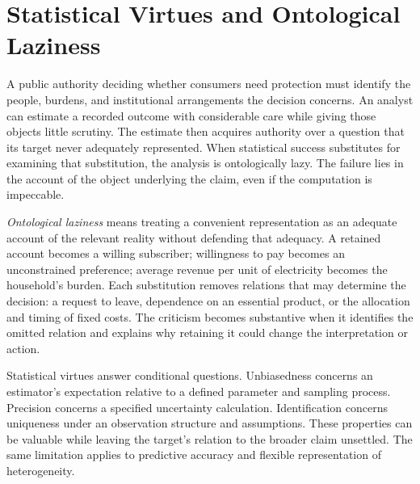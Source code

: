 
\hypertarget{M09-statistical-virtues-and-ontological-laziness}{%
\section{Statistical Virtues and Ontological
Laziness}\label{M09-statistical-virtues-and-ontological-laziness}}

\noindent \noindent A public authority deciding whether consumers need protection
must identify the people, burdens, and institutional arrangements the
decision concerns. An analyst can estimate a recorded outcome with
considerable care while giving those objects little scrutiny. The
estimate then acquires authority over a question that its target never
adequately represented. When statistical success substitutes for
examining that substitution, the analysis is ontologically lazy. The
failure lies in the account of the object underlying the claim, even if
the computation is impeccable.

\emph{Ontological laziness} means treating a convenient representation
as an adequate account of the relevant reality without defending that
adequacy. A retained account becomes a willing subscriber; willingness
to pay becomes an unconstrained preference; average revenue per unit of
electricity becomes the household's burden. Each substitution removes
relations that may determine the decision: a request to leave,
dependence on an essential product, or the allocation and timing of
fixed costs. The criticism becomes substantive when it identifies the
omitted relation and explains why retaining it could change the
interpretation or action.

Statistical virtues answer conditional questions. Unbiasedness concerns
an estimator's expectation relative to a defined parameter and sampling
process. Precision concerns a specified uncertainty calculation.
Identification concerns uniqueness under an observation structure and
assumptions. These properties can be valuable while leaving the target's
relation to the broader claim unsettled. The same limitation applies to
predictive accuracy and flexible representation of heterogeneity.

